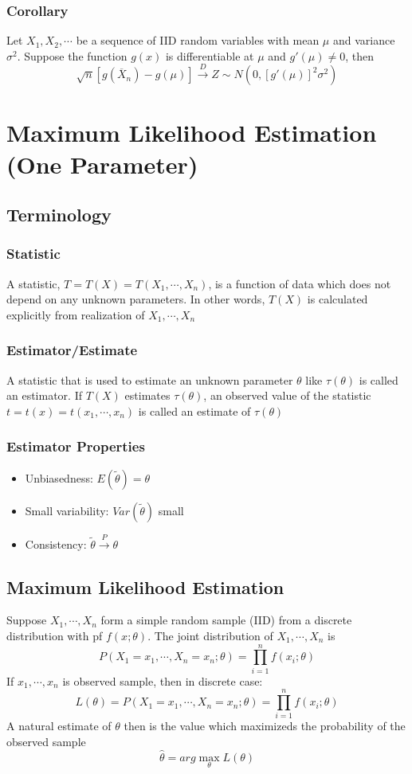 \documentclass[11pt]{article}
\begin{document}
\subsubsection*{Corollary}
Let $X_1,X_2,\cdots$ be a sequence of IID random variables with mean $\mu$ and variance $\sigma^2$. Suppose the function $g(x)$ is differentiable at $\mu$ and $g'(\mu)\neq 0$, then 
\[\sqrt{n}\left[g(\overline{X}_n)-g(\mu)\right]\overset{D}{\rightarrow}Z\sim N(0, [g'(\mu)]^2\sigma^2)\] 

\section{Maximum Likelihood Estimation (One Parameter)}
\subsection{Terminology}
\subsubsection{Statistic}
A statistic, $T=T(X)=T(X_1,\cdots,X_n)$, is a function of data which does not depend on any unknown parameters. In other words, $T(X)$ is calculated explicitly from realization of $X_1,\cdots,X_n$
\subsubsection{Estimator/Estimate}
A statistic that is used to estimate an unknown parameter $\theta$ like $\tau(\theta)$ is called an estimator. If $T(X)$ estimates $\tau(\theta)$, an observed value of the 
statistic $t=t(x)=t(x_1,\cdots,x_n)$ is called an estimate of $\tau(\theta)$
\subsubsection*{Estimator Properties}
\begin{itemize}
    \item Unbiasedness: $E(\tilde{\theta})=\theta$
    \item Small variability: $Var(\tilde{\theta})$ small 
    \item Consistency: $\tilde{\theta}\overset{P}{\rightarrow}\theta$
\end{itemize}
\subsection{Maximum Likelihood Estimation}
Suppose $X_1,\cdots,X_n$ form a simple random sample (IID) from a discrete distribution with pf $f(x;\theta)$. The joint distribution of 
$X_1,\cdots,X_n$ is 
\[P(X_1=x_1,\cdots,X_n=x_n;\theta) = \prod_{i=1}^{n}f(x_i;\theta)\]
If $x_1,\cdots,x_n$ is observed sample, then in discrete case:
\[L(\theta)=P(X_1=x_1,\cdots,X_n=x_n;\theta) = \prod_{i=1}^{n}f(x_i;\theta)\]
A natural estimate of $\theta$ then is the value which maximizeds the probability of the observed sample 
\[\hat\theta = arg \max_{\theta}L(\theta)\]
\end{document}
